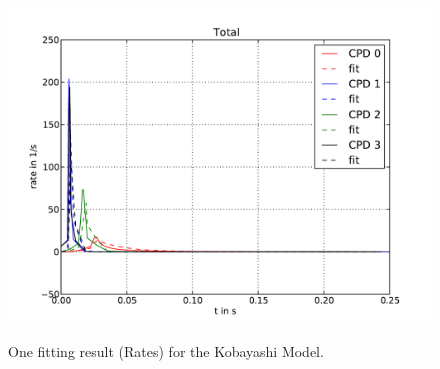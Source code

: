 \begin{figure}
\centering%
\includegraphics[height=9cm,angle=0]{Figures/CPD-Fit_result_Kob_Total_R}
\caption{One fitting result (Rates) for the Kobayashi Model.}
\label{F_Fit_Kob_R}
\end{figure}

